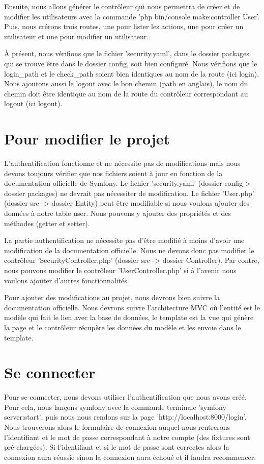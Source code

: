 \documentclass{article}
\theoremstyle{definition}
\theoremstyle{remark}
\begin{document}
Ensuite, nous allons générer le contrôleur qui nous permettra de créer et de modifier les utilisateurs avec la commande 'php bin/console make:controller User'. Puis, nous crérons trois routes, une pour lister les actions, une pour créer un utilisateur et une pour modifier un utilisateur.

À présent, nous vérifions que le fichier 'security.yaml', dans le dossier packages qui se trouve être dans le dossier config, soit bien configuré. Nous vérifions que le login\_path et le check\_path soient bien identiques au nom de la route (ici login). Nous ajoutons aussi le logout avec le bon chemin (path en anglais), le nom du chemin doit être identique au nom de la route du contrôleur correspondant au logout (ici logout).

\section{Pour modifier le projet}

L'authentification fonctionne et ne nécessite pas de modifications mais nous devons toujours vérifier que nos fichiers soient à jour en fonction de la documentation officielle de Symfony. Le fichier 'security.yaml' (dossier config-> dossier packages) ne devrait pas nécessiter de modification. Le fichier 'User.php' (dossier src -> dossier Entity) peut être modifiable si nous voulons ajouter des données à notre table user. Nous pouvons y ajouter des propriétés et des méthodes (getter et setter).

La partie authentification ne nécessite pas d'être modifié à moins d'avoir une modification de la documentation officielle. Nous ne devons donc pas modifier le contrôleur 'SecurityController.php' (dossier src -> dossier Controller). Par contre, nous pouvons modifier le contrôleur 'UserController.php' si à l'avenir nous voulons ajouter d'autres fonctionnalités.

Pour ajouter des modifications au projet, nous devrons bien suivre la documentation officielle. Nous devrons suivre l'architecture MVC où l'entité est le modèle qui fait le lien avec la base de données, le template est la vue qui génère la page et le contrôleur récupère les données du modèle et les envoie dans le template.

\section{Se connecter}

Pour se connecter, nous devons utiliser l'authentification que nous avons créé. Pour cela, nous lançons symfony avec la commande terminale 'symfony server:start', puis nous nous rendons sur la page 'http://localhost:8000/login'. Nous trouverons alors le formulaire de connexion auquel nous rentrerons l'identifiant et le mot de passe correspondant à notre compte (des fixtures sont pré-chargées). Si l'identifiant et si le mot de passe sont correctes alors la connexion aura réussie sinon la connexion aura échoué et il faudra recommencer.
\end{document}
